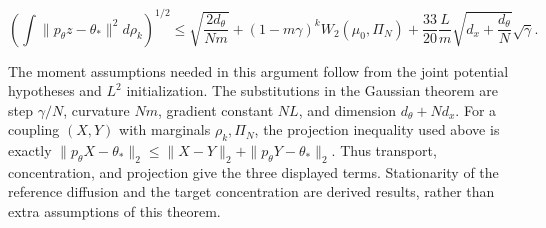 \documentclass[11pt,a4paper]{report}
\begin{document}
\[\left(\int\|p_\theta z-\theta_*\|^2d\rho_k\right)^{1/2}\le\sqrt{\frac{2d_\theta}{Nm}}+(1-m\gamma)^kW_2(\mu_0,\Pi_N)+\frac{33}{20}\frac Lm\sqrt{d_x+\frac{d_\theta}{N}}\sqrt\gamma.\]

The moment assumptions needed in this argument follow from the joint potential hypotheses and \(L^2\) initialization. The substitutions in the Gaussian theorem are step \(\gamma/N\), curvature \(Nm\), gradient constant \(NL\), and dimension \(d_\theta+Nd_x\). For a coupling \((X,Y)\) with marginals \(\rho_k,\Pi_N\), the projection inequality used above is exactly \(\|p_\theta X-\theta_*\|_2\le\|X-Y\|_2+\|p_\theta Y-\theta_*\|_2\). Thus transport, concentration, and projection give the three displayed terms. Stationarity of the reference diffusion and the target concentration are derived results, rather than extra assumptions of this theorem.
\end{document}
